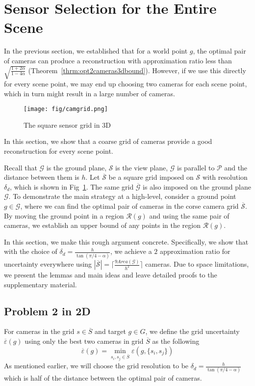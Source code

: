 \section{Sensor Selection for the Entire Scene}\label{sec:camgrid}

In the previous section, we established that for a world point $g$, the optimal pair of cameras can produce a reconstruction with approximation ratio less than $\sqrt{\frac{1+2\alpha}{1-4\alpha}}$ (Theorem~\ref{thrm:opt2cameras3dbound}).
However, if we use this directly for every scene point, we may end up choosing two cameras for each scene point, which in turn might result in a large number of cameras.

 \begin{figure}[h]
 \centering
 	\texttt{[image: fig/camgrid.png]}
 	\caption{The square sensor grid in 3D}
 	\label{fig:grid}
 \end{figure}


In this section, we show that a coarse grid of cameras provide a good reconstruction for every scene point.

Recall that $\mathcal{G}$ is the ground plane, $\mathcal{S}$ is the view plane,   $\mathcal{G}$ is parallel to  $\mathcal{P}$ and the distance between them is $h$. 
Let $\mathcal{\overline{S}}$ be a square grid imposed on $\mathcal{S}$ with resolution $\delta_d$, which is shown in Fig~\ref{fig:grid}. The same grid $\mathcal{\overline{G}}$ is also imposed on the ground plane $\mathcal{G}$. 
To demonstrate the main strategy at a high-level, consider a ground point $g \in \mathcal{G}$, where we can find the optimal pair of cameras in the corse camera grid $\mathcal{\overline{S}}$. By moving the ground point in a region $\mathcal{R}(g)$ and using the same pair of cameras, we establish an upper bound of any points in the region $\mathcal{R}(g)$.

In this section, we make this rough argument concrete. Specifically, we show that 
with the choice of $\delta_d = \frac{h}{\tan(\pi/4-\alpha)}$, we achieve a $2$ approximation ratio for uncertainty everywhere using 
$|\mathcal{\overline{S}}| = \lceil \frac{9Area(\mathcal{G})}{h^2} \rceil$ cameras.
Due to space limitations, we present the lemmas and main ideas and leave detailed proofs to the supplementary material.

\subsection{Problem 2 in 2D}
For cameras in the grid $s \in \overline{S}$ and target $g \in G$, we define the grid uncertainty $\overline{\varepsilon}(g)$ using only the best two cameras in grid $\overline{S}$ as the following
$$
\overline{\varepsilon}(g) = \min_{s_i, s_j \in \overline{S}}\varepsilon(g,\{s_i,s_j\}) 
$$
As mentioned earlier, we will choose the grid resolution to be $\delta_d = \frac{h}{\tan(\pi/4-\alpha)}$ which is half of the distance between the optimal pair of cameras. 


